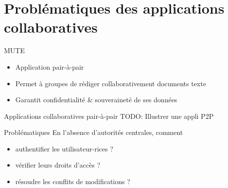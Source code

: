 \section{Problématiques des applications collaboratives}

\begin{frame}{MUTE }
    \begin{figure}
    \end{figure}
    \vspace{-0.5cm}
    \begin{itemize}
        \item Application pair-à-pair
        \item Permet à groupes de rédiger collaborativement documents texte
        \item Garantit confidentialité \& souveraineté de ses données
    \end{itemize}
\end{frame}

\begin{frame}{Applications collaboratives pair-à-pair}
    TODO: Illustrer une appli P2P
    \begin{block}{Problématiques}
        En l'absence d'autorités centrales, comment
        \begin{itemize}
            \item authentifier les utilisateur-rices ?
            \item vérifier leurs droits d'accès ?
            \item \alert{résoudre les conflits de modifications ?}
        \end{itemize}
    \end{block}
\end{frame}

